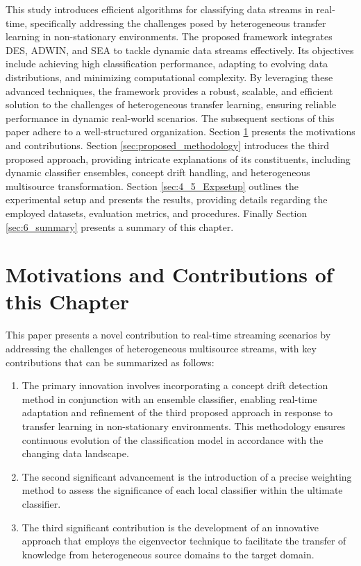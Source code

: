 This study introduces efficient algorithms for classifying data streams in real-time, specifically addressing the challenges posed by heterogeneous transfer learning in non-stationary environments. The proposed framework integrates DES, ADWIN, and SEA to tackle dynamic data streams effectively. Its objectives include achieving high classification performance, adapting to evolving data distributions, and minimizing computational complexity. By leveraging these advanced techniques, the framework provides a robust, scalable, and efficient solution to the challenges of heterogeneous transfer learning, ensuring reliable performance in dynamic real-world scenarios.
The subsequent sections of this paper adhere to a well-structured organization. Section \ref{sec:6_2_motivation} presents the motivations and contributions. Section \ref{sec:proposed_methodology} introduces the third proposed approach, providing intricate explanations of its constituents, including dynamic classifier ensembles, concept drift handling, and heterogeneous multisource transformation. Section \ref{sec:4_5_Expsetup} outlines the experimental setup and presents the results, providing details regarding the employed datasets, evaluation metrics, and procedures. Finally Section \ref{sec:6_summary} presents a summary of this chapter.

\section{Motivations and Contributions of this Chapter} \label{sec:6_2_motivation}
This paper presents a novel contribution to real-time streaming scenarios by addressing the challenges of heterogeneous multisource streams, with key contributions that can be summarized as follows:
\begin{enumerate}[nosep]
  \setlength{\itemsep}{0pt}
  \setlength{\parskip}{0pt}
  \item The primary innovation involves incorporating a concept drift detection method in conjunction with an ensemble classifier, enabling real-time adaptation and refinement of the third proposed approach in response to transfer learning in non-stationary environments. This methodology ensures continuous evolution of the classification model in accordance with the changing data landscape.
  \item The second significant advancement is the introduction of a precise weighting method to assess the significance of each local classifier within the ultimate classifier.
 \item The third significant contribution is the development of an innovative approach that employs the eigenvector technique to facilitate the transfer of knowledge from heterogeneous source domains to the target domain.
  \end{enumerate} 
 
   

